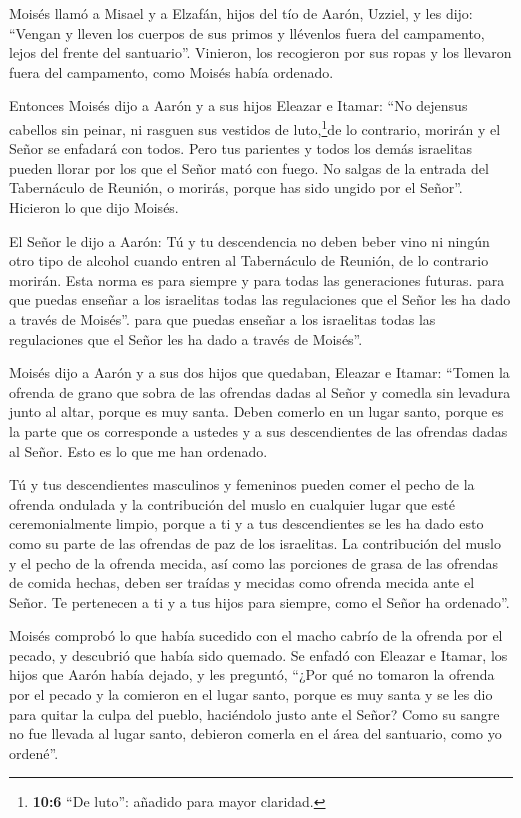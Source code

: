  Moisés llamó a Misael y a Elzafán, hijos del tío de Aarón,
Uzziel, y les dijo: ``Vengan y lleven los cuerpos de sus primos y
llévenlos fuera del campamento, lejos del frente del santuario''.
 Vinieron, los recogieron por sus ropas y los llevaron fuera
del campamento, como Moisés había ordenado.

 Entonces Moisés dijo a Aarón y a sus hijos Eleazar e
Itamar: ``No dejensus cabellos sin peinar, ni rasguen sus vestidos de
luto,\footnote{\textbf{10:6} ``De luto'': añadido para mayor claridad.}de
lo contrario, morirán y el Señor se enfadará con todos. Pero tus
parientes y todos los demás israelitas pueden llorar por los que el
Señor mató con fuego.  No salgas de la entrada del
Tabernáculo de Reunión, o morirás, porque has sido ungido por el
Señor''. Hicieron lo que dijo Moisés.

 El Señor le dijo a Aarón:  Tú y tu descendencia
no deben beber vino ni ningún otro tipo de alcohol cuando entren al
Tabernáculo de Reunión, de lo contrario morirán. Esta norma es para
siempre y para todas las generaciones futuras.  para que
puedas enseñar a los israelitas todas las regulaciones que el Señor les
ha dado a través de Moisés''.  para que puedas enseñar a
los israelitas todas las regulaciones que el Señor les ha dado a través
de Moisés''.

 Moisés dijo a Aarón y a sus dos hijos que quedaban,
Eleazar e Itamar: ``Tomen la ofrenda de grano que sobra de las ofrendas
dadas al Señor y comedla sin levadura junto al altar, porque es muy
santa.  Deben comerlo en un lugar santo, porque es la parte
que os corresponde a ustedes y a sus descendientes de las ofrendas dadas
al Señor. Esto es lo que me han ordenado.

 Tú y tus descendientes masculinos y femeninos pueden comer
el pecho de la ofrenda ondulada y la contribución del muslo en cualquier
lugar que esté ceremonialmente limpio, porque a ti y a tus descendientes
se les ha dado esto como su parte de las ofrendas de paz de los
israelitas.  La contribución del muslo y el pecho de la
ofrenda mecida, así como las porciones de grasa de las ofrendas de
comida hechas, deben ser traídas y mecidas como ofrenda mecida ante el
Señor. Te pertenecen a ti y a tus hijos para siempre, como el Señor ha
ordenado''.

 Moisés comprobó lo que había sucedido con el macho cabrío
de la ofrenda por el pecado, y descubrió que había sido quemado. Se
enfadó con Eleazar e Itamar, los hijos que Aarón había dejado, y les
preguntó,  ``¿Por qué no tomaron la ofrenda por el pecado y
la comieron en el lugar santo, porque es muy santa y se les dio para
quitar la culpa del pueblo, haciéndolo justo ante el Señor?
 Como su sangre no fue llevada al lugar santo, debieron
comerla en el área del santuario, como yo ordené''.

